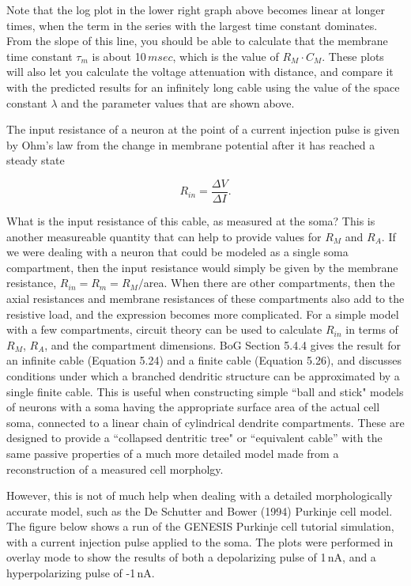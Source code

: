 \documentclass[12pt]{article}
\begin{document}
Note that the log plot in the lower right graph above becomes linear at longer times, when the term in the series with the largest time constant dominates. From the slope of this line, you should be able to calculate that the membrane time constant $\tau_m$ is about 10\,$msec$, which is the value of $R_M\cdot C_M$. These plots will also let you calculate the voltage attenuation with distance, and compare it with the predicted results for an infinitely long cable using the value of the space constant $\lambda$ and the parameter values that are shown above.

The input resistance of a neuron at the point of a current injection pulse is given by Ohm's law from the change in membrane potential after it has reached a steady state

\begin{displaymath}
	R_{in} = \frac{\Delta V}{\Delta I}.
\end{displaymath}

What is the input resistance of this cable, as measured at the soma? This is another measureable quantity that can help to provide values for $R_M$ and $R_A$. If we were dealing with a neuron that could be modeled as a single soma compartment, then the input resistance would simply be given by the membrane resistance, $R_{in} = R_m = R_M/$area. When there are other compartments, then the axial resistances and membrane resistances of these compartments also add to the resistive load, and the expression becomes more complicated. For a simple model with a few compartments, circuit theory can be used to calculate $R_{in}$ in terms of $R_M$, $R_A$, and the compartment dimensions. BoG Section 5.4.4 gives the result for an infinite cable (Equation 5.24) and a finite cable (Equation 5.26), and discusses conditions under which a branched dendritic structure can be approximated by a single finite cable. This is useful when constructing simple ``ball and stick" models of neurons with a soma having the appropriate surface area of the actual cell soma, connected to a linear chain of cylindrical dendrite compartments. These are designed to provide a ``collapsed dentritic tree" or ``equivalent cable'' with the same passive properties of a much more detailed model made from a reconstruction of a measured cell morpholgy.

However, this is not of much help when dealing with a detailed morphologically accurate model, such as the De Schutter and Bower (1994) Purkinje cell model. The figure below shows a run of the GENESIS Purkinje cell tutorial simulation, with a current injection pulse applied to the soma. The plots were performed in overlay mode to show the results of both a depolarizing pulse of 1\,nA, and a hyperpolarizing pulse of -1\,nA.
\end{document}
